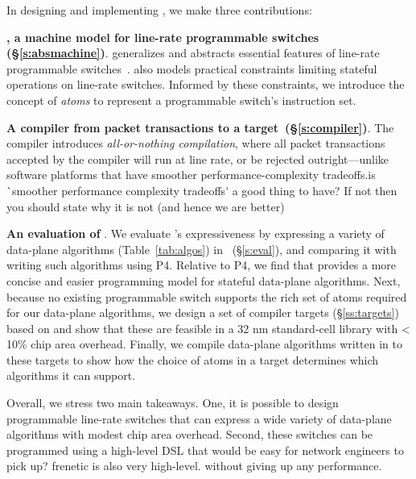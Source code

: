 In designing and implementing \pktlanguage, we make three contributions:
\begin{CompactEnumerate}
\item \textbf{\absmachine, a machine model for line-rate programmable switches
  (\S\ref{s:absmachine})}.  \absmachine generalizes and abstracts
  essential features of line-rate programmable switches~\cite{rmt, xpliant,
  flexpipe}. \absmachine also models practical constraints limiting stateful
  operations on line-rate switches.  Informed by these constraints, we
  introduce the concept of {\em atoms} to represent a programmable switch's
  instruction set.

\item \textbf{A compiler from \pktlanguage packet transactions to
  a \absmachine target~(\S\ref{s:compiler})}. The \pktlanguage compiler
  introduces \textit{all-or-nothing compilation}, where all packet transactions
  accepted by the compiler will run at line rate, or be rejected
  outright---unlike software platforms that have smoother
  performance-complexity tradeoffs.\ac{is `smoother performance complexity tradeoffs'
  a good thing to have? If not then you should state why it is not (and hence we 
  are better)}

\item \textbf{An evaluation of \pktlanguage}. We evaluate \pktlanguage's
  expressiveness by expressing a variety of data-plane algorithms (Table~\ref{tab:algos})
  in \pktlanguage~(\S\ref{s:eval}), and comparing it with writing such  
  algorithms using P4.  Relative to P4, we find that \pktlanguage provides a more
  concise and easier programming model for stateful data-plane algorithms.
  Next, because no existing programmable switch supports the rich set of atoms
  required for our data-plane algorithms, we design a set of compiler targets
  (\S\ref{ss:targets}) based on \absmachine and show that these are feasible in
  a 32 nm standard-cell library with < 10\% chip area overhead.  Finally, we
  compile data-plane algorithms written in \pktlanguage to these targets to
  show how the choice of atoms in a target determines which algorithms it can
  support.
\end{CompactEnumerate}

Overall, we stress two main takeaways. One, it is possible to design
programmable line-rate switches that can express a wide variety of data-plane
algorithms with modest chip area overhead. Second, these switches can be
programmed using a high-level DSL \ac{that would be easy for network engineers to pick up?
frenetic is also very high-level.}
without giving up any performance.
